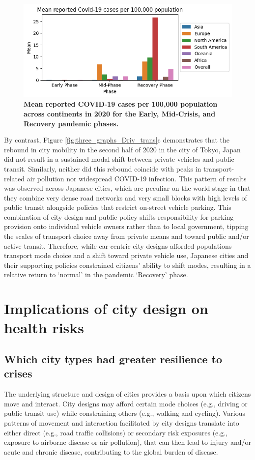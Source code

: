 \documentclass[preprint,10pt]{elsarticle} %
\begin{document}
\begin{figure}
\centering

\includegraphics[trim={0 0 0 0},clip,scale=0.8]{Images/covidCases7Ave_plot.png}
\caption{\bf Mean reported COVID-19 cases per 100,000 population across  continents in 2020 for the Early, Mid-Crisis, and Recovery pandemic phases.}  
 \label{fig:covidCases7Ave}
\end{figure}

By contrast, Figure \ref{fig:three_graphs_Driv_trans}c demonstrates that the rebound in city mobility in the second half of 2020 in the city of Tokyo, Japan did not result in a sustained modal shift between private vehicles and public transit. Similarly, neither did this rebound coincide with peaks in transport-related air pollution nor widespread COVID-19 infection. This pattern of results was observed across Japanese cities, which are peculiar on the world stage in that they combine very dense road networks and very small blocks with high levels of public transit alongside policies that restrict on-street vehicle parking\cite{clements2019socialising}. This combination of city design and public policy shifts responsibility for parking provision onto individual vehicle owners rather than to local government, tipping the scales of transport choice away from private means and toward public and/or active transit. Therefore, while car-centric city designs afforded populations transport mode choice and a shift toward private vehicle use, Japanese cities and their supporting policies constrained citizens' ability to shift modes, resulting in a relative return to `normal' in the pandemic `Recovery' phase.


\section*{\textcolor{OliveGreen}{Implications of city design on health risks}}
\subsection*{Which city types had greater resilience to crises}
The underlying structure and design of cities provides a basis upon which citizens move and interact. City designs may afford certain mode choices (e.g., driving or public transit use) while constraining others (e.g., walking and cycling). Various patterns of movement and interaction facilitated by city designs translate into either direct (e.g., road traffic collisions) or secondary risk exposures (e.g., exposure to airborne disease or air pollution), that can then lead to injury and/or acute and chronic disease, contributing to the global burden of disease.
\end{document}
